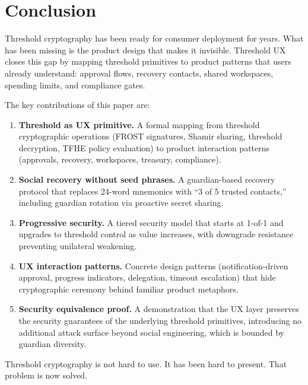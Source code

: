 \section{Conclusion}
\label{sec:conclusion}

Threshold cryptography has been ready for consumer deployment for years.
What has been missing is the product design that makes it invisible.
Threshold UX closes this gap by mapping threshold primitives to product
patterns that users already understand: approval flows, recovery contacts,
shared workspaces, spending limits, and compliance gates.

The key contributions of this paper are:

\begin{enumerate}
    \item \textbf{Threshold as UX primitive.} A formal mapping from
    threshold cryptographic operations (FROST signatures, Shamir sharing,
    threshold decryption, TFHE policy evaluation) to product interaction
    patterns (approvals, recovery, workspaces, treasury, compliance).

    \item \textbf{Social recovery without seed phrases.} A guardian-based
    recovery protocol that replaces 24-word mnemonics with ``3 of 5 trusted
    contacts,'' including guardian rotation via proactive secret sharing.

    \item \textbf{Progressive security.} A tiered security model that
    starts at 1-of-1 and upgrades to threshold control as value increases,
    with downgrade resistance preventing unilateral weakening.

    \item \textbf{UX interaction patterns.} Concrete design patterns
    (notification-driven approval, progress indicators, delegation,
    timeout escalation) that hide cryptographic ceremony behind familiar
    product metaphors.

    \item \textbf{Security equivalence proof.} A demonstration that the
    UX layer preserves the security guarantees of the underlying threshold
    primitives, introducing no additional attack surface beyond social
    engineering, which is bounded by guardian diversity.
\end{enumerate}

Threshold cryptography is not hard to use. It has been hard to present.
That problem is now solved.

